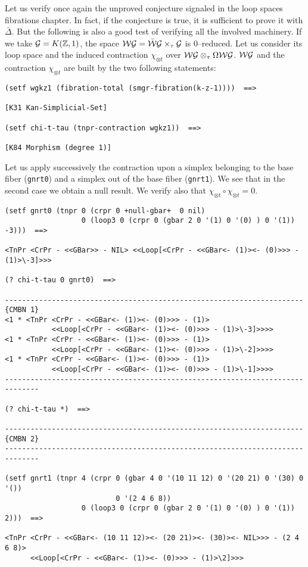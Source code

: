 \newpage
Let us verify once again the unproved conjecture signaled in the loop spaces fibrations
chapter. In fact, if the conjecture is true, it is sufficient to prove
it with $\bar{\Delta}$. But the following is also a good test of verifying all the
involved machinery. If we take ${\cal G}= K({{\Bbb Z}},1)$, the space 
${\cal WG}=\bar{\cal W}{\cal G} \times_\tau  {\cal G}$ is $0$--reduced. Let us consider
its loop space and the induced contraction $\chi_{\otimes t}$ over
${\cal WG} \otimes_\tau \Omega{\cal WG}$. ${\cal WG}$ and the contraction $\chi_{\otimes t}$
are  built by the two following statements:
{\footnotesize\begin{verbatim}
(setf wgkz1 (fibration-total (smgr-fibration(k-z-1))))  ==>

[K31 Kan-Simplicial-Set]

(setf chi-t-tau (tnpr-contraction wgkz1))  ==>

[K84 Morphism (degree 1)]
\end{verbatim}}
Let us apply successively the contraction upon  a simplex belonging to
the base fiber ({\tt gnrt0}) and a simplex out of the base fiber ({\tt gnrt1}).
We see that in the second case we obtain a null result. We verify also that
$\chi_{\otimes t}\circ \chi_{\otimes t}=0$.
{\footnotesize\begin{verbatim}
(setf gnrt0 (tnpr 0 (crpr 0 +null-gbar+  0 nil)
                  0 (loop3 0 (crpr 0 (gbar 2 0 '(1) 0 '(0) ) 0 '(1)) -3)))  ==>

<TnPr <CrPr - <<GBar>> - NIL> <<Loop[<CrPr - <<GBar<- (1)><- (0)>>> - (1)>\-3]>>>

(? chi-t-tau 0 gnrt0)  ==>

----------------------------------------------------------------------{CMBN 1}
<1 * <TnPr <CrPr - <<GBar<- (1)><- (0)>>> - (1)> 
           <<Loop[<CrPr - <<GBar<- (1)><- (0)>>> - (1)>\-3]>>>>
<1 * <TnPr <CrPr - <<GBar<- (1)><- (0)>>> - (1)> 
           <<Loop[<CrPr - <<GBar<- (1)><- (0)>>> - (1)>\-2]>>>>
<1 * <TnPr <CrPr - <<GBar<- (1)><- (0)>>> - (1)> 
           <<Loop[<CrPr - <<GBar<- (1)><- (0)>>> - (1)>\-1]>>>>
------------------------------------------------------------------------------

(? chi-t-tau *)  ==>

----------------------------------------------------------------------{CMBN 2}
------------------------------------------------------------------------------

(setf gnrt1 (tnpr 4 (crpr 0 (gbar 4 0 '(10 11 12) 0 '(20 21) 0 '(30) 0 '())
                          0 '(2 4 6 8))
                  0 (loop3 0 (crpr 0 (gbar 2 0 '(1) 0 '(0) ) 0 '(1)) 2)))  ==>

<TnPr <CrPr - <<GBar<- (10 11 12)><- (20 21)><- (30)><- NIL>>> - (2 4 6 8)> 
      <<Loop[<CrPr - <<GBar<- (1)><- (0)>>> - (1)>\2]>>>
\end{verbatim}}
